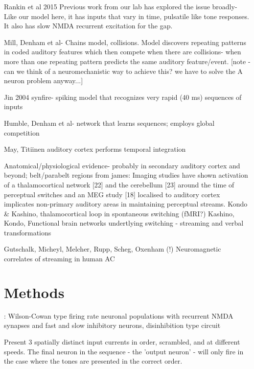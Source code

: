 Rankin et al 2015 \cite{Rankin2015} Previous work from our lab has explored the issue broadly-
Like our model here, it has inputs that vary in time, pulsatile like tone responses.
It also has slow NMDA recurrent excitation for the gap.

Mill, Denham et al- Chains model, collisions. 
Model discovers repeating patterns in coded auditory features which then compete when there are collisions- when more than one repeating pattern predicts the same auditory feature/event.
[note - can we think of a neuromechanistic way to achieve this? we have to solve the A neuron problem anyway...]



Jin 2004 synfire- spiking model that recognizes very rapid (40 ms) sequences of inputs



Humble, Denham et al- network that learns sequences; employs global competition



May, Titiinen auditory cortex performs temporal integration


Anatomical/physiological evidence- probably in secondary auditory cortex and beyond; belt/parabelt regions
from james:
 Imaging studies have shown activation of a thalamocortical network [22] and the cerebellum [23] around the time of perceptual switches and an MEG study [18] localised to auditory cortex implicates non-primary auditory areas in maintaining perceptual streams.
Kondo & Kashino, thalamocortical loop in spontaneous switching (fMRI?)
Kashino, Kondo, Functional brain networks undertlying switching - streaming and verbal transformations

 Gutschalk, Micheyl, Melcher, Rupp, Scheg, Oxenham (!) Neuromagnetic correlates of streaming in human AC


\section{Methods}: 
Wilson-Cowan type firing rate neuronal populations with recurrent NMDA synapses and fast and slow inhibitory neurons, disinhibition type circuit

Present 3 spatially distinct input currents in order, scrambled, and at different speeds. The final neuron in the sequence - the 'output neuron' - will only fire in the case where the tones are presented in the correct order.


